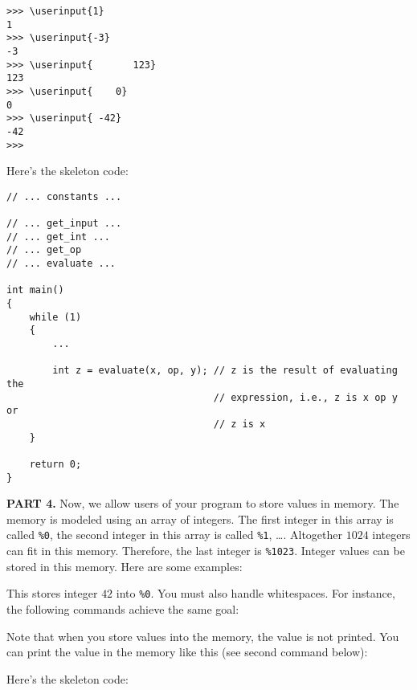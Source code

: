 \begin{Verbatim}[frame=single, commandchars=\\\{\}]
>>> \userinput{1}
1
>>> \userinput{-3}
-3
>>> \userinput{       123}
123
>>> \userinput{    0}
0
>>> \userinput{ -42}
-42
>>> 
\end{Verbatim}

Here's the skeleton code:

\begin{Verbatim}[frame=single, commandchars=\\\@\!]
// ... constants ...

// ... get_input ...
// ... get_int ...
// ... get_op
// ... evaluate ...

int main()
{
    while (1)
    {
        ...

        int z = evaluate(x, op, y); // z is the result of evaluating the
                                    // expression, i.e., z is x op y or
                                    // z is x
    }

    return 0;
}
\end{Verbatim}

\textbf{PART 4.} Now, we allow users of your program to store values in memory.
The memory is modeled using an array of integers. The first integer in this
array is called \verb!%0!, the second integer in this array is called \verb!%1!,
\dots . Altogether $1024$ integers can fit in this memory. Therefore, the last
integer is \verb!%1023!. Integer values can be stored in this memory. Here are some
examples:
\begin{console}[commandchars=\\\{\}]
>>> \userinput{%
\end{console}
This stores integer $42$ into \verb!%0!. You must also handle whitespaces.
For instance, the following commands achieve the same goal:
\begin{console}[commandchars=\\\{\}]
>>> \userinput{      %
>>> \userinput{%
>>> \userinput{%
\end{console}
Note that when you store values into the memory, the value is not printed.
You can print the value in the memory like this (see second command below):

Here's the skeleton code:

